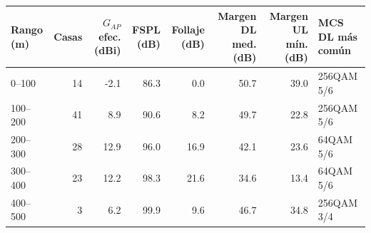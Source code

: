 \begin{tabular}{lrrrrrrl}\toprule Rango (m) & Casas & $G_{AP}$ efec. (dBi) & FSPL (dB) & Follaje (dB) & Margen DL med. (dB) & Margen UL mín. (dB) & MCS DL más común\\\midrule
0--100 & 14 & -2.1 & 86.3 & 0.0 & 50.7 & 39.0 & 256QAM 5/6\\
100--200 & 41 & 8.9 & 90.6 & 8.2 & 49.7 & 22.8 & 256QAM 5/6\\
200--300 & 28 & 12.9 & 96.0 & 16.9 & 42.1 & 23.6 & 64QAM 5/6\\
300--400 & 23 & 12.2 & 98.3 & 21.6 & 34.6 & 13.4 & 64QAM 5/6\\
400--500 & 3 & 6.2 & 99.9 & 9.6 & 46.7 & 34.8 & 256QAM 3/4\\\bottomrule\end{tabular}
